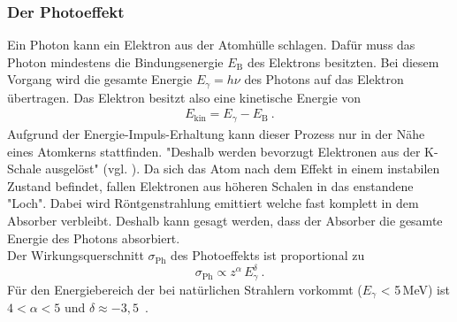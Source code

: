 \subsubsection{Der Photoeffekt}
Ein Photon kann ein Elektron aus der Atomhülle schlagen. Dafür muss das Photon mindestens die Bindungsenergie $E_\text{B}$ des Elektrons besitzten. Bei diesem Vorgang wird die gesamte Energie $E_\gamma = h\nu$ des Photons auf das Elektron übertragen. Das Elektron besitzt also eine kinetische Energie von
\begin{align}
	E_\text{kin} = E_\gamma - E_\text{B} \ .
\end{align}
Aufgrund der Energie-Impuls-Erhaltung kann dieser Prozess nur in der Nähe eines Atomkerns stattfinden. "Deshalb werden bevorzugt Elektronen aus der K-Schale ausgelöst" (vgl. \cite[3]{V18}). Da sich das Atom nach dem Effekt in einem instabilen Zustand befindet, fallen Elektronen aus höheren Schalen in das enstandene "Loch". Dabei wird Röntgenstrahlung emittiert welche fast komplett in dem Absorber verbleibt. Deshalb kann gesagt werden, dass der Absorber die gesamte Energie des Photons absorbiert. \\
Der Wirkungsquerschnitt $\sigma_\text{Ph}$ des Photoeffekts ist proportional zu
\begin{equation}
	\sigma_\text{Ph} \propto z^{\alpha}\,E_\gamma^{\delta} \ .
\end{equation}
Für den Energiebereich der bei natürlichen Strahlern vorkommt ($E_\gamma$ < 5\,MeV) ist $4 < \alpha < 5$ und $\delta \approx -3,5$\ .



